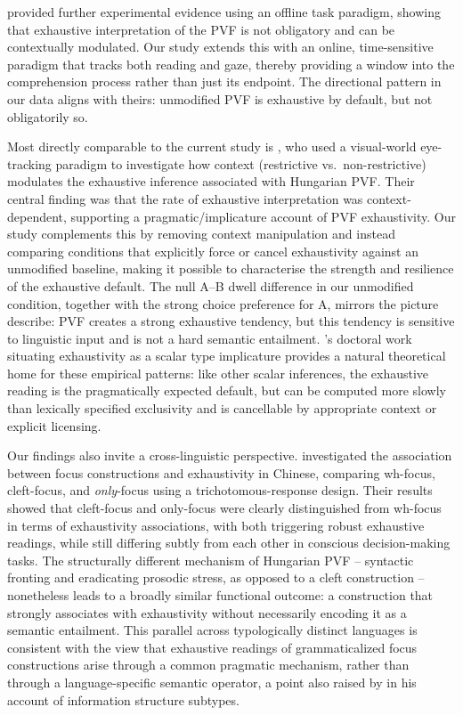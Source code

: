 \documentclass[a4paper, ruler]{CUP-JNL-LIN}%
\begin{document}
\citet{gerocs_2014_exhaustivity} provided further experimental evidence using an offline task paradigm, showing that exhaustive interpretation of the PVF is not obligatory and can be contextually modulated. Our study extends this with an online, time-sensitive paradigm that tracks both reading and gaze, thereby providing a window into the comprehension process rather than just its endpoint. The directional pattern in our data aligns with theirs: unmodified PVF is exhaustive by default, but not obligatorily so.

Most directly comparable to the current study is \citet{kaldi_2018_linguistic}, who used a visual-world eye-tracking paradigm to investigate how context (restrictive vs.\ non-restrictive) modulates the exhaustive inference associated with Hungarian PVF. Their central finding was that the rate of exhaustive interpretation was context-dependent, supporting a pragmatic/implicature account of PVF exhaustivity. Our study complements this by removing context manipulation and instead comparing conditions that explicitly force or cancel exhaustivity against an unmodified baseline, making it possible to characterise the strength and resilience of the exhaustive default. The null A--B dwell difference in our unmodified condition, together with the strong choice preference for A, mirrors the picture \citeauthor{kaldi_2018_linguistic} describe: PVF creates a strong exhaustive tendency, but this tendency is sensitive to linguistic input and is not a hard semantic entailment. \citet{kaldi_2021_hungarian_preverbal}'s doctoral work situating exhaustivity as a scalar type implicature provides a natural theoretical home for these empirical patterns: like other scalar inferences, the exhaustive reading is the pragmatically expected default, but can be computed more slowly than lexically specified exclusivity and is cancellable by appropriate context or explicit licensing.

Our findings also invite a cross-linguistic perspective. \citet{hsu_2019_associations} investigated the association between focus constructions and exhaustivity in Chinese, comparing wh-focus, cleft-focus, and \textit{only}-focus using a trichotomous-response design. Their results showed that cleft-focus and only-focus were clearly distinguished from wh-focus in terms of exhaustivity associations, with both triggering robust exhaustive readings, while still differing subtly from each other in conscious decision-making tasks. The structurally different mechanism of Hungarian PVF -- syntactic fronting and eradicating prosodic stress, as opposed to a cleft construction -- nonetheless leads to a broadly similar functional outcome: a construction that strongly associates with exhaustivity without necessarily encoding it as a semantic entailment. This parallel across typologically distinct languages is consistent with the view that exhaustive readings of grammaticalized focus constructions arise through a common pragmatic mechanism, rather than through a language-specific semantic operator, a point also raised by \citet{krifka_2008_basic} in his account of information structure subtypes.
\end{document}
